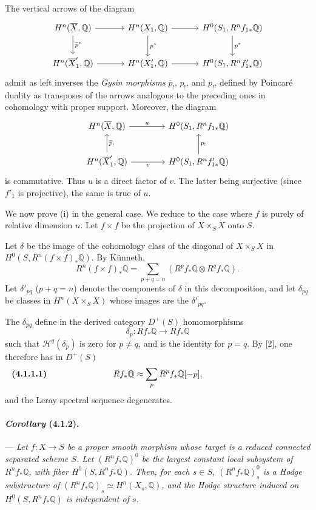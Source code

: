 \documentclass[10pt]{article}
\newcommand{\Q}{\mathbb Q}
\begin{document}
The vertical arrows of the diagram
\[
\begin{tikzcd}[column sep=3.2em,row sep=2.2em]
H^n(\overline X,\Q) \arrow[r] \arrow[d,"\overline p^*"] &
H^n(X_1,\Q) \arrow[r] \arrow[d,"p^*"] &
H^0(S_1,R^nf_{1*}\Q) \arrow[d,"p^*"]\\
H^n(\overline X'_1,\Q) \arrow[r] &
H^n(X'_1,\Q) \arrow[r] &
H^0(S_1,R^nf'_{1*}\Q)
\end{tikzcd}
\]
admit as left inverses the \emph{Gysin morphisms} $\overline p_!$, $p_!$, and $p_!$, defined by Poincaré duality as transposes of the arrows analogous to the preceding ones in cohomology with proper support. Moreover, the diagram
\[
\begin{tikzcd}[column sep=4em,row sep=2.2em]
H^n(\overline X,\Q) \arrow[r,"u"] &
H^0(S_1,R^nf_{1*}\Q)\\
H^n(\overline X'_1,\Q) \arrow[u,"\overline p_!"'] \arrow[r,"v"'] &
H^0(S_1,R^nf'_{1*}\Q) \arrow[u,"p_!"']
\end{tikzcd}
\]
is commutative. Thus $u$ is a direct factor of $v$. The latter being surjective (since $f'_1$ is projective), the same is true of $u$.

We now prove (i) in the general case. We reduce to the case where $f$ is purely of relative dimension $n$. Let $f\times f$ be the projection of $X\times_SX$ onto $S$.

Let $\delta$ be the image of the cohomology class of the diagonal of $X\times_SX$ in $H^0(S,R^n(f\times f)_*\Q)$. By Künneth,
\[
R^n(f\times f)_*\Q=
\sum_{p+q=n}(R^pf_*\Q\otimes R^qf_*\Q).
\]
Let $\delta'_{pq}$ ($p+q=n$) denote the components of $\delta$ in this decomposition, and let $\delta_{pq}$ be classes in $H^n(X\times_SX)$ whose images are the $\delta'_{pq}$.

The $\delta_{pq}$ define in the derived category $D^+(S)$ homomorphisms
\[
\delta_p:Rf_*\Q\longrightarrow Rf_*\Q
\]
such that $\mathcal H^q(\delta_p)$ is zero for $p\ne q$, and is the identity for $p=q$. By [2], one therefore has in $D^+(S)$
\[
\makebox[\textwidth][s]{\textbf{(4.1.1.1)}\hfill$\displaystyle Rf_*\Q\approx\sum_p R^pf_*\Q[-p],$\hfill\phantom{\textbf{(4.1.1.1)}}}
\]
and the Leray spectral sequence degenerates.

\paragraph{\emph{Corollary} (4.1.2).} --- {\itshape Let $f:X\to S$ be a proper smooth morphism whose target is a reduced connected separated scheme $S$. Let $(R^nf_*\Q)^0$ be the largest constant local subsystem of $R^nf_*\Q$, with fiber $H^0(S,R^nf_*\Q)$. Then, for each $s\in S$, $(R^nf_*\Q)^0_s$ is a Hodge substructure of $(R^nf_*\Q)_s\simeq H^n(X_s,\Q)$, and the Hodge structure induced on $H^0(S,R^nf_*\Q)$ is independent of $s$.}
\end{document}
